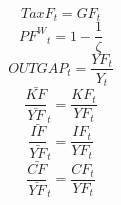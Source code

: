 \begin{dmath}
{TaxF}_{t}={GF}_{t}
\end{dmath}
\begin{dmath}
{PF^{W}}_{t}=1-\frac{1}{{{\zeta}}}
\end{dmath}
\begin{dmath}
{OUTGAP}_{t}=\frac{{YF}_{t}}{{Y}_{t}}
\end{dmath}
\begin{dmath}
{\frac{\bar{KF}}{\bar{YF}}}_{t}=\frac{{KF}_{t}}{{YF}_{t}}
\end{dmath}
\begin{dmath}
{\frac{\bar{IF}}{\bar{YF}}}_{t}=\frac{{IF}_{t}}{{YF}_{t}}
\end{dmath}
\begin{dmath}
{\frac{\bar{CF}}{\bar{YF}}}_{t}=\frac{{CF}_{t}}{{YF}_{t}}
\end{dmath}
